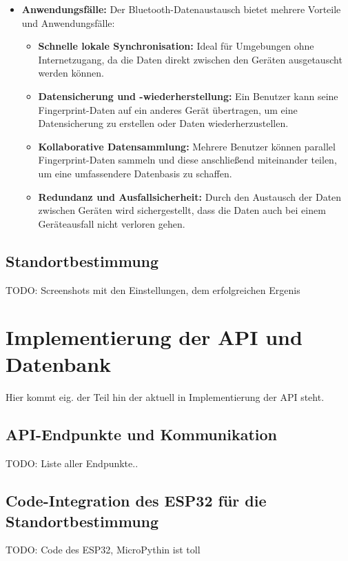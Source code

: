 \begin{itemize}
    \item \textbf{Anwendungsfälle:} Der Bluetooth-Datenaustausch bietet mehrere Vorteile und Anwendungsfälle:
          \begin{itemize}
              \item \textbf{Schnelle lokale Synchronisation:} Ideal für Umgebungen ohne Internetzugang, da die Daten direkt zwischen den Geräten ausgetauscht werden können.
              \item \textbf{Datensicherung und -wiederherstellung:} Ein Benutzer kann seine Fingerprint-Daten auf ein anderes Gerät übertragen, um eine Datensicherung zu erstellen oder Daten wiederherzustellen.
              \item \textbf{Kollaborative Datensammlung:} Mehrere Benutzer können parallel Fingerprint-Daten sammeln und diese anschließend miteinander teilen, um eine umfassendere Datenbasis zu schaffen.
              \item \textbf{Redundanz und Ausfallsicherheit:} Durch den Austausch der Daten zwischen Geräten wird sichergestellt, dass die Daten auch bei einem Geräteausfall nicht verloren gehen.
          \end{itemize}
\end{itemize}

\subsection{Standortbestimmung}

TODO: Screenshots mit den Einstellungen, dem erfolgreichen Ergenis


\section{Implementierung der API und Datenbank}

Hier kommt eig. der Teil hin der aktuell in Implementierung der API steht.

\subsection{API-Endpunkte und Kommunikation}

TODO: Liste aller Endpunkte..

\subsection{Code-Integration des ESP32 für die Standortbestimmung}

TODO: Code des ESP32, MicroPythin ist toll
